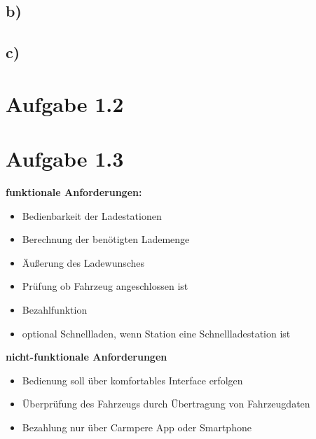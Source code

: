 \documentclass[a4paper,11pt]{scrartcl}
\begin{document}
	\subsection*{b)}
	\subsection*{c)}
	
	\section*{Aufgabe 1.2}
	
	\section*{Aufgabe 1.3}
	\textbf{funktionale Anforderungen:}
	\begin{itemize}
		\item Bedienbarkeit der Ladestationen
		\item Berechnung der benötigten Lademenge
		\item Äußerung des Ladewunsches
		\item Prüfung ob Fahrzeug angeschlossen ist
		\item Bezahlfunktion
		\item optional Schnellladen, wenn Station eine Schnellladestation ist
	\end{itemize}
	\textbf{nicht-funktionale Anforderungen}
	\begin{itemize}
		\item Bedienung soll über komfortables Interface erfolgen
		\item Überprüfung des Fahrzeugs durch Übertragung von Fahrzeugdaten
		\item Bezahlung nur über Carmpere App oder Smartphone
	\end{itemize}
	
	
\end{document}
